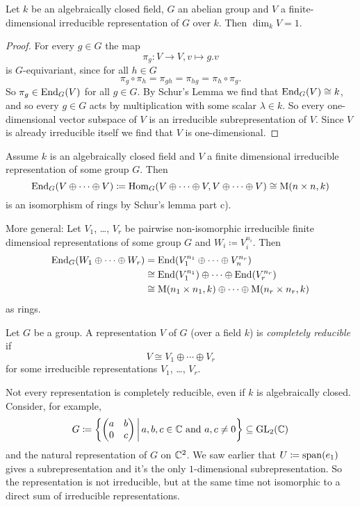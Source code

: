 \begin{cor}
 Let $k$ be an algebraically closed field, $G$ an abelian group and $V$ a finite-dimensional irreducible representation of $G$ over $k$. Then $\dim_k V = 1$.
\end{cor}
\begin{proof}
 For every $g \in G$ the map
 \[
  \pi_g \colon V \to V, v \mapsto g.v
 \]
 is $G$-equivariant, since for all $h \in G$
 \[
  \pi_g \circ \pi_h = \pi_{gh} = \pi_{hg} = \pi_h \circ \pi_g.
 \]
 So $\pi_g \in \operatorname{End}_G(V)$ for all $g \in G$. By Schur’s Lemma we find that $\operatorname{End}_G(V) \cong k$, and so every $g \in G$ acts by multiplication with some scalar $\lambda \in k$. So every one-dimensional vector subspace of $V$ is an irreducible subrepresentation of $V$. Since $V$ is already irreducible itself we find that $V$ is one-dimensional.
\end{proof}


\begin{rem}
 Assume $k$ is an algebraically closed field and $V$ a finite dimensional irreducible representation of some group $G$. Then
 \[
  \operatorname{End}_G(V \oplus \dotsb \oplus V)
  \coloneqq \operatorname{Hom}_G(V \oplus \dotsb \oplus V, V \oplus \dotsb \oplus V)
  \cong \operatorname{M}(n \times n, k)
 \]
 is an isomorphism of rings by Schur’s lemma part c).
 
 More general: Let $V_1$, \dots, $V_r$ be pairwise non-isomorphic irreducible finite dimensioal representations of some group $G$ and $W_i \coloneqq V_i^{n_i}$. Then
 \begin{align*}
  \operatorname{End}_G(W_1 \oplus \dotsb \oplus W_r)
  &= \operatorname{End}(V_1^{n_1} \oplus \dotsb \oplus V_n^{n_r}) \\
  &\cong \operatorname{End}(V_1^{n_1}) \oplus \dotsb \oplus \operatorname{End}(V_r^{n_r}) \\
  &\cong \operatorname{M}(n_1 \times n_1, k) \oplus \dotsb \oplus \operatorname{M}(n_r \times n_r, k)
 \end{align*}
 as rings.
\end{rem}


\begin{defi}
 Let $G$ be a group. A representation $V$ of $G$ (over a field $k$) is \emph{completely reducible} if
 \[
  V \cong V_1 \oplus \dotsb \oplus V_r
 \]
 for some irreducible representations $V_1$, \dots, $V_r$.
\end{defi}


\begin{rem}
 Not every representation is completely reducible, even if $k$ is algebraically closed. Consider, for example,
 \[
  G \coloneqq \left\{\begin{pmatrix}a & b \\ 0 & c\end{pmatrix} \,\middle|\, a,b,c \in \mathbb{C} \text{ and } a,c \neq 0\right\}
  \subseteq \operatorname{GL}_2(\mathbb{C})
 \]
 and the natural representation of $G$ on $\mathbb{C}^2$. We saw earlier that $U \coloneqq \operatorname{span}(e_1)$ gives a subrepresentation and it’s the only $1$-dimensional subrepresentation. So the representation is not irreducible, but at the same time not isomorphic to a direct sum of irreducible representations.
\end{rem}


